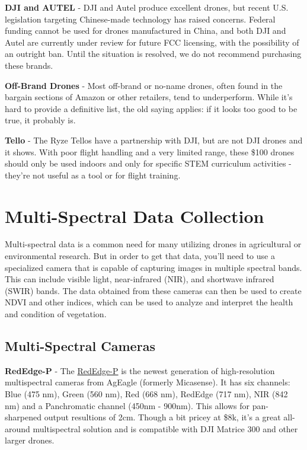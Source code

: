 \documentclass[
  12pt,
]{book}
\begin{document}
\textbf{DJI and AUTEL} - DJI and Autel produce excellent drones, but recent U.S. legislation targeting Chinese-made technology has raised concerns. Federal funding cannot be used for drones manufactured in China, and both DJI and Autel are currently under review for future FCC licensing, with the possibility of an outright ban. Until the situation is resolved, we do not recommend purchasing these brands.

\textbf{Off-Brand Drones} - Most off-brand or no-name drones, often found in the bargain sections of Amazon or other retailers, tend to underperform. While it's hard to provide a definitive list, the old saying applies: if it looks too good to be true, it probably is.

\textbf{Tello} - The Ryze Tellos have a partnership with DJI, but are not DJI drones and it shows. With poor flight handling and a very limited range, these \$100 drones should only be used indoors and only for specific STEM curriculum activities - they're not useful as a tool or for flight training.

\section{Multi-Spectral Data Collection}\label{multi-spectral-data-collection}

Multi-spectral data is a common need for many utilizing drones in agricultural or environmental research. But in order to get that data, you'll need to use a specialized camera that is capable of capturing images in multiple spectral bands. This can include visible light, near-infrared (NIR), and shortwave infrared (SWIR) bands. The data obtained from these cameras can then be used to create NDVI and other indices, which can be used to analyze and interpret the health and condition of vegetation.

\subsection{Multi-Spectral Cameras}\label{multi-spectral-cameras}

\textbf{RedEdge-P} - The \href{https://ageagle.com/drone-sensors/rededge-p/}{RedEdge-P} is the newest generation of high-resolution multispectral cameras from AgEagle (formerly Micasense). It has six channels: Blue (475 nm), Green (560 nm), Red (668 nm), RedEdge (717 nm), NIR (842 nm) and a Panchromatic channel (450nm - 900nm). This allows for pan-sharpened output resultions of 2cm. Though a bit pricey at \$8k, it's a great all-around multispectral solution and is compatible with DJI Matrice 300 and other larger drones.
\end{document}
